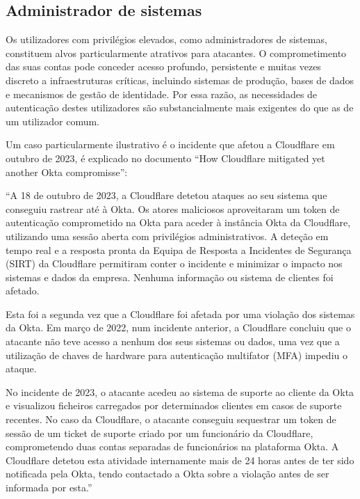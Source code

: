 \subsection{Administrador de sistemas}

\hspace{1cm} Os utilizadores com privilégios elevados, como administradores de sistemas, constituem alvos particularmente atrativos para atacantes. O comprometimento das suas contas pode conceder acesso profundo, persistente e muitas vezes discreto a infraestruturas críticas, incluindo sistemas de produção, bases de dados e mecanismos de gestão de identidade. Por essa razão, as necessidades de autenticação destes utilizadores são substancialmente mais exigentes do que as de um utilizador comum.

\hspace{1cm} Um caso particularmente ilustrativo é o incidente que afetou a Cloudflare em outubro de 2023, é explicado no documento “How Cloudflare mitigated yet another Okta compromisse”:

\hspace{1cm} “A 18 de outubro de 2023, a Cloudflare detetou ataques ao seu sistema que conseguiu rastrear até à Okta. Os atores maliciosos aproveitaram um token de autenticação comprometido na Okta para aceder à instância Okta da Cloudflare, utilizando uma sessão aberta com privilégios administrativos. A deteção em tempo real e a resposta pronta da Equipa de Resposta a Incidentes de Segurança (SIRT) da Cloudflare permitiram conter o incidente e minimizar o impacto nos sistemas e dados da empresa. Nenhuma informação ou sistema de clientes foi afetado.

\hspace{1cm} Esta foi a segunda vez que a Cloudflare foi afetada por uma violação dos sistemas da Okta. Em março de 2022, num incidente anterior, a Cloudflare concluiu que o atacante não teve acesso a nenhum dos seus sistemas ou dados, uma vez que a utilização de chaves de hardware para autenticação multifator (MFA) impediu o ataque.

\hspace{1cm} No incidente de 2023, o atacante acedeu ao sistema de suporte ao cliente da Okta e visualizou ficheiros carregados por determinados clientes em casos de suporte recentes. No caso da Cloudflare, o atacante conseguiu sequestrar um token de sessão de um ticket de suporte criado por um funcionário da Cloudflare, comprometendo duas contas separadas de funcionários na plataforma Okta. A Cloudflare detetou esta atividade internamente mais de 24 horas antes de ter sido notificada pela Okta, tendo contactado a Okta sobre a violação antes de ser informada por esta.”

